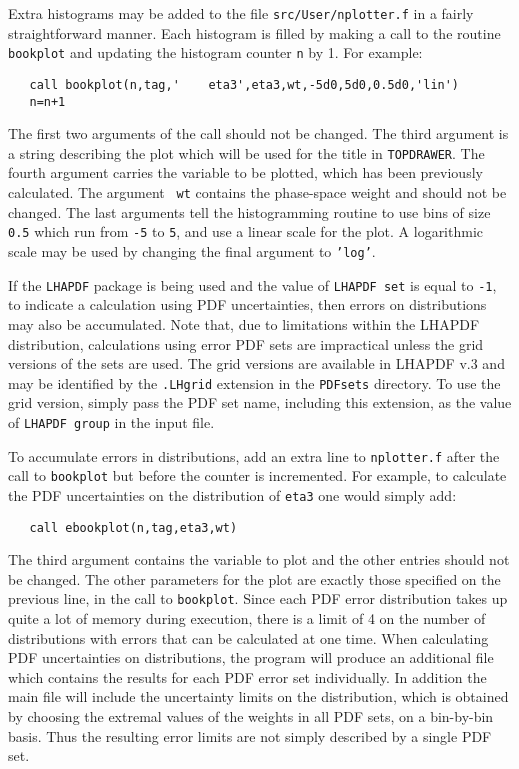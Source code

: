 \documentclass[12pt]{article}
\begin{document}
Extra histograms may be added to the file {\tt src/User/nplotter.f} in
a fairly straightforward manner. Each histogram is filled by making
a call to the routine {\tt bookplot} and updating the histogram
counter {\tt n} by 1. For example:

\begin{verbatim}
   call bookplot(n,tag,'    eta3',eta3,wt,-5d0,5d0,0.5d0,'lin')
   n=n+1
\end{verbatim}
The first two arguments of the call should not be changed. The third
argument is a string describing the plot which will be used for the
title in {\tt TOPDRAWER}. The fourth argument carries the variable to
be plotted, which has been previously calculated. The argument {\tt
wt} contains the phase-space weight and should not be changed. The
last arguments tell the histogramming routine to use bins of size {\tt
0.5} which run from {\tt -5} to {\tt 5}, and use a linear scale for
the plot. A logarithmic scale may be used by changing the final
argument to {\tt 'log'}.

If the {\tt LHAPDF} package is being used and the value of
{\tt LHAPDF set} is equal to {\tt -1},  to indicate a calculation using
PDF uncertainties, then errors on distributions may also be accumulated.
Note that, due to limitations within the LHAPDF distribution, calculations
using error PDF sets are impractical unless the grid versions of the sets
are used. The grid versions are available in LHAPDF v.3 and may be identified
by the {\tt .LHgrid} extension in the {\tt PDFsets} directory. To use the
grid version, simply pass the PDF set name, including this extension, as
the value of {\tt LHAPDF group} in the input file.
 
To accumulate errors in distributions, add an extra
line to {\tt nplotter.f} after the
call to {\tt bookplot} but before the counter is incremented. For
example, to calculate the PDF uncertainties on the distribution
of {\tt eta3} one would simply add:
\begin{verbatim}
   call ebookplot(n,tag,eta3,wt)
\end{verbatim}
The third argument contains the variable to plot and the other entries
should not be changed. The other parameters for the plot are exactly
those specified on the previous line, in the call to {\tt bookplot}.
Since each PDF error distribution takes up quite a lot of memory
during execution, there is a limit of 4 on the number of distributions
with errors that can be calculated at one time. When calculating
PDF uncertainties on distributions, the program will produce an
additional file which contains the results for each PDF error set
individually. In addition the main file will include the uncertainty
limits on the distribution, which is obtained by choosing the extremal
values of the weights in all PDF sets, on a bin-by-bin basis. Thus
the resulting error limits are not simply described by a single PDF
set.
\end{document}
